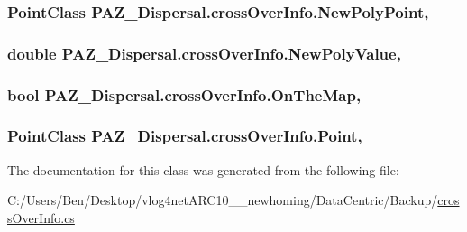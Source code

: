 \hypertarget{class_p_a_z___dispersal_1_1cross_over_info_ad2ef1811387d9f75d07d5def2c22ecbc}{
\subsubsection[{New\-Poly\-Point}]{\setlength{\rightskip}{0pt plus 5cm}Point\-Class P\-A\-Z\-\_\-\-Dispersal.\-cross\-Over\-Info.\-New\-Poly\-Point\hspace{0.3cm}{\ttfamily [get]}, {\ttfamily [set]}}}\label{class_p_a_z___dispersal_1_1cross_over_info_ad2ef1811387d9f75d07d5def2c22ecbc}
\hypertarget{class_p_a_z___dispersal_1_1cross_over_info_a10877a3be09103990f81b2d80bff03d9}{
\subsubsection[{New\-Poly\-Value}]{\setlength{\rightskip}{0pt plus 5cm}double P\-A\-Z\-\_\-\-Dispersal.\-cross\-Over\-Info.\-New\-Poly\-Value\hspace{0.3cm}{\ttfamily [get]}, {\ttfamily [set]}}}\label{class_p_a_z___dispersal_1_1cross_over_info_a10877a3be09103990f81b2d80bff03d9}
\hypertarget{class_p_a_z___dispersal_1_1cross_over_info_a2d0a4f4ceb5869c211daa30d6229918c}{
\subsubsection[{On\-The\-Map}]{\setlength{\rightskip}{0pt plus 5cm}bool P\-A\-Z\-\_\-\-Dispersal.\-cross\-Over\-Info.\-On\-The\-Map\hspace{0.3cm}{\ttfamily [get]}, {\ttfamily [set]}}}\label{class_p_a_z___dispersal_1_1cross_over_info_a2d0a4f4ceb5869c211daa30d6229918c}
\hypertarget{class_p_a_z___dispersal_1_1cross_over_info_a917f552ee64421422e1883dea11be3c0}{
\subsubsection[{Point}]{\setlength{\rightskip}{0pt plus 5cm}Point\-Class P\-A\-Z\-\_\-\-Dispersal.\-cross\-Over\-Info.\-Point\hspace{0.3cm}{\ttfamily [get]}, {\ttfamily [set]}}}\label{class_p_a_z___dispersal_1_1cross_over_info_a917f552ee64421422e1883dea11be3c0}


The documentation for this class was generated from the following file\-:\begin{DoxyCompactItemize}
\item 
C\-:/\-Users/\-Ben/\-Desktop/vlog4net\-A\-R\-C10\-\_\-\_\-newhoming/\-Data\-Centric/\-Backup/\hyperlink{_backup_2cross_over_info_8cs}{cross\-Over\-Info.\-cs}\end{DoxyCompactItemize}
